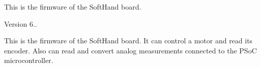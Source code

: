 This is the firmware of the Soft\+Hand board. \begin{DoxyVersion}{Version}
6..
\end{DoxyVersion}
This is the firmware of the Soft\+Hand board. It can control a motor and read its encoder. Also can read and convert analog measurements connected to the P\+SoC microcontroller. 